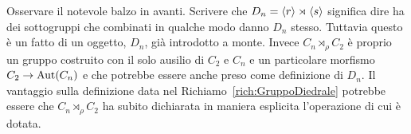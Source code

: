 Osservare il notevole balzo in avanti. Scrivere che $D_n = \left\langle r\right\rangle \rtimes \left\langle s\right\rangle$ significa dire ha dei sottogruppi che combinati in qualche modo danno $D_n$ stesso. Tuttavia questo è un fatto di un oggetto, $D_n$, già introdotto a monte. Invece $C_n \rtimes_\rho C_2$ è proprio un gruppo costruito con il solo ausilio di $C_2$ e $C_n$ e un particolare morfismo $C_2 \to \mathrm{Aut}(C_n)$ e che potrebbe essere anche preso come definizione di $D_n$. Il vantaggio sulla definizione data nel Richiamo~\ref{rich:GruppoDiedrale} potrebbe essere che $C_n \rtimes_\rho C_2$ ha subito dichiarata in maniera esplicita l'operazione di cui è dotata.



